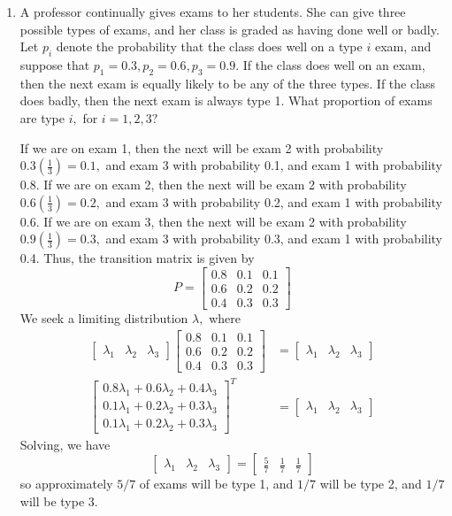 \documentclass{article}
\begin{document}
\begin{enumerate}
	\item A professor continually gives exams to her students. She can give three possible types of exams, and her class is graded as having done well or badly. Let $p_i$ denote the probability that the class does well on a type $i$ exam, and suppose that $p_1=0.3, p_2=0.6, p_3=0.9.$ If the class does well on an exam, then the next exam is equally likely to be any of the three types. If the class does badly, then the next exam is always type 1. What proportion of exams are type $i,$ for $i=1, 2, 3?$
		\begin{soln}
			If we are on exam 1, then the next will be exam 2 with probability $0.3\left( \frac{1}{3} \right)=0.1,$ and exam 3 with probability 0.1, and exam 1 with probability 0.8. If we are on exam 2, then the next will be exam 2 with probability $0.6\left( \frac{1}{3} \right)=0.2,$ and exam 3 with probability 0.2, and exam 1 with probability 0.6. If we are on exam 3, then the next will be exam 2 with probability $0.9\left( \frac{1}{3} \right)=0.3,$ and exam 3 with probability 0.3, and exam 1 with probability 0.4. Thus, the transition matrix is given by
			\[P=\begin{bmatrix}
					0.8 & 0.1 & 0.1 \\
					0.6 & 0.2 & 0.2 \\
					0.4 & 0.3 & 0.3
			\end{bmatrix}\]
			We seek a limiting distribution $\lambda,$ where
			\begin{align*}
				\begin{bmatrix}
					\lambda_1 & \lambda_2 & \lambda_3
				\end{bmatrix}\begin{bmatrix}
					0.8 & 0.1 & 0.1 \\
					0.6 & 0.2 & 0.2 \\
					0.4 & 0.3 & 0.3
				\end{bmatrix} &= \begin{bmatrix}
					\lambda_1 & \lambda_2 & \lambda_3
				\end{bmatrix} \\
				\begin{bmatrix}
					0.8\lambda_1 + 0.6\lambda_2+0.4\lambda_3 \\
					0.1\lambda_1+0.2\lambda_2+0.3\lambda_3 \\
					0.1\lambda_1+0.2\lambda_2+0.3\lambda_3
				\end{bmatrix}^T &= \begin{bmatrix}
					\lambda_1 & \lambda_2 & \lambda_3
				\end{bmatrix}
			\end{align*}
			Solving, we have
			\[\begin{bmatrix}
					\lambda_1 & \lambda_2 &\lambda_3
				\end{bmatrix} = \begin{bmatrix}
					\frac{5}{7} & \frac{1}{7} & \frac{1}{7}
			\end{bmatrix}\]
			so approximately $5/7$ of exams will be type 1, and $1/7$ will be type 2, and $1/7$ will be type 3.
		\end{soln}

\end{enumerate}
\end{document}
